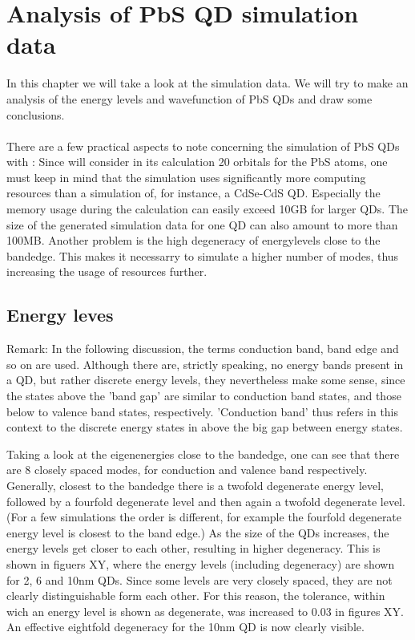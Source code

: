 \chapter{Analysis of PbS QD simulation data}
In this chapter we will take a look at the simulation data. We will try to make an analysis of the energy levels and wavefunction of PbS QDs and draw some conclusions.\\
\\
There are a few practical aspects to note concerning the simulation of PbS QDs with \omen: Since \omen will consider in its calculation 20 orbitals for the PbS atoms, one must keep in mind that the simulation uses significantly more computing resources than a simulation of, for instance, a CdSe-CdS QD. Especially the memory usage during the calculation can easily exceed 10GB for larger QDs. The size of the generated simulation data for one QD can also amount to more than 100MB.
Another problem is the high degeneracy of energylevels close to the bandedge. This makes it necessarry to simulate a higher number of modes, thus increasing the usage of resources further.

\section{Energy leves}

Remark: In the following discussion, the terms conduction band, band edge and so on are used. Although there are, strictly speaking, no energy bands present in a QD, but rather discrete energy levels, they nevertheless make some sense, since the states above the 'band gap' are similar to conduction band states, and those below to valence band states, respectively.  'Conduction band' thus refers in this context to the discrete energy states in above the big gap between energy states.

Taking a look at the eigenenergies close to the bandedge, one can see that there are 8 closely spaced modes, for conduction and valence band respectively.
Generally, closest to the bandedge there is a twofold degenerate energy level, followed by a fourfold degenerate level and then again a twofold degenerate level. (For a few simulations the order is different, for example the fourfold degenerate energy level is closest to the band edge.)
As the size of the QDs increases, the energy levels get closer to each other, resulting in higher degeneracy. This is shown in figuers XY, where the energy levels (including degeneracy) are shown for 2, 6 and 10nm QDs. Since some levels are very closely spaced, they are not clearly distinguishable form each other. For this reason, the tolerance, within wich an energy level is shown as degenerate, was increased to 0.03 in figures XY. An effective eightfold degeneracy for the 10nm  QD is now clearly visible.


